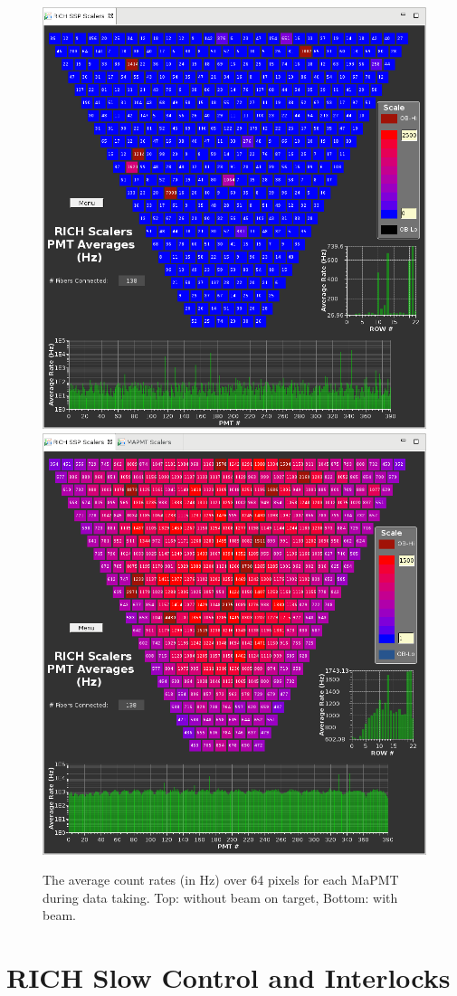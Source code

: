 \documentclass[5p,times,twocolumn]{elsarticle}
\begin{document}
\begin{figure}[t]
\begin{center}
\includegraphics[width=0.7\columnwidth]{Scalers_BeamOff.png}
\includegraphics[width=0.7\columnwidth]{Scalers_BeamOn.png}
\end{center}
\caption{The average count rates (in Hz) over 64 pixels for each MaPMT during data taking. Top: without beam on
  target, Bottom: with beam.}
\label{fig:Online_Scalers}
\end{figure}

\section{RICH Slow Control and Interlocks}
\label{sec:SlowControl}
\end{document}
